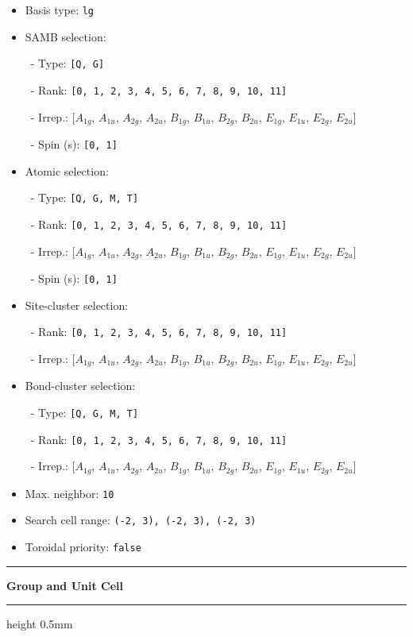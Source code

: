 \documentclass[fleqn,10pt,landscape]{jsarticle}
\begin{document}
\begin{itemize}
\item Basis type: \texttt{lg}

\item SAMB selection:

\, - Type: \texttt{[Q, G]}

\, - Rank: \texttt{[0, 1, 2, 3, 4, 5, 6, 7, 8, 9, 10, 11]}

\, - Irrep.: [$A_{1g}$, $A_{1u}$, $A_{2g}$, $A_{2u}$, $B_{1g}$, $B_{1u}$, $B_{2g}$, $B_{2u}$, $E_{1g}$, $E_{1u}$, $E_{2g}$, $E_{2u}$]

\, - Spin (s): \texttt{[0, 1]}

\item Atomic selection:

\, - Type: \texttt{[Q, G, M, T]}

\, - Rank: \texttt{[0, 1, 2, 3, 4, 5, 6, 7, 8, 9, 10, 11]}

\, - Irrep.: [$A_{1g}$, $A_{1u}$, $A_{2g}$, $A_{2u}$, $B_{1g}$, $B_{1u}$, $B_{2g}$, $B_{2u}$, $E_{1g}$, $E_{1u}$, $E_{2g}$, $E_{2u}$]

\, - Spin (s): \texttt{[0, 1]}

\item Site-cluster selection:

\, - Rank: \texttt{[0, 1, 2, 3, 4, 5, 6, 7, 8, 9, 10, 11]}

\, - Irrep.: [$A_{1g}$, $A_{1u}$, $A_{2g}$, $A_{2u}$, $B_{1g}$, $B_{1u}$, $B_{2g}$, $B_{2u}$, $E_{1g}$, $E_{1u}$, $E_{2g}$, $E_{2u}$]

\item Bond-cluster selection:

\, - Type: \texttt{[Q, G, M, T]}

\, - Rank: \texttt{[0, 1, 2, 3, 4, 5, 6, 7, 8, 9, 10, 11]}

\, - Irrep.: [$A_{1g}$, $A_{1u}$, $A_{2g}$, $A_{2u}$, $B_{1g}$, $B_{1u}$, $B_{2g}$, $B_{2u}$, $E_{1g}$, $E_{1u}$, $E_{2g}$, $E_{2u}$]

\item Max. neighbor: \texttt{10}

\item Search cell range: \texttt{(-2, 3), (-2, 3), (-2, 3)}

\item Toroidal priority: \texttt{false}

\end{itemize}
\vspace{5mm}
\noindent \rule[0.5mm]{5mm}{0.5mm}\hspace{3mm}\textbf{Group and Unit Cell}\hspace{3mm}\leaders\hrule height 0.5mm\hfill\kern0pt
\vspace{3mm}
\end{document}
